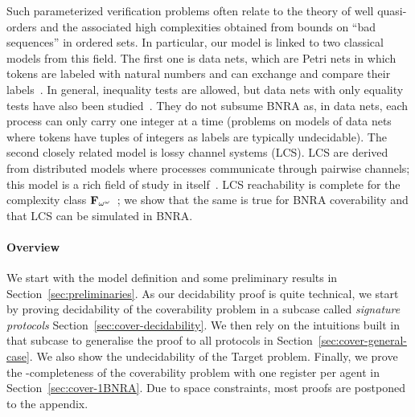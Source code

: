 Such parameterized verification problems often relate to the theory of well quasi-orders
and the associated high complexities obtained from bounds on ``bad sequences'' in ordered sets. In particular, our model is linked to two classical models from this field. The first one is data nets, which are Petri nets in which tokens are labeled with natural numbers and can exchange and compare their labels~\cite{LazicNORW08}. In general, inequality tests are allowed, but data nets with only equality tests have also been studied~\cite{Rosa-Velardo17}. They do not subsume BNRA as, in data nets, each process can only carry one integer at a time (problems on models of data nets where tokens have tuples of integers as labels are typically undecidable).
The second closely related model is lossy channel systems (LCS)\cite{AbdullaJ1996verif}. LCS are derived from distributed models where processes communicate through pairwise channels; this model is a rich field of study in itself~\cite{Aiswarya2015model,Aiswarya2020networks}. LCS reachability is complete for the complexity class $\mathbf{F}_{\omega^\omega}$~\cite{ChambartS08ordinal, Schnoebelen2002verifying}; we show that the same is true for BNRA coverability and that LCS can be simulated in BNRA.

\paragraph*{Overview}
We start with the model definition and some preliminary results in Section~\ref{sec:preliminaries}. As our decidability proof is quite technical, we start by proving decidability of the coverability problem in a subcase called \emph{signature protocols} Section~\ref{sec:cover-decidability}.
We then rely on the intuitions built in that subcase to generalise the proof to all protocols in Section~\ref{sec:cover-general-case}. We also show the undecidability of the Target problem.
Finally, we prove the \NP-completeness of the coverability problem with one register per agent in Section~\ref{sec:cover-1BNRA}.
Due to space constraints, most proofs are postponed to the appendix.

